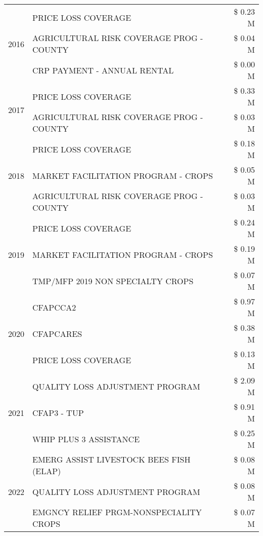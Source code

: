 \begin{tabular}{llr}
\cline{1-3}
\multirow[t]{3}{*}{2016} & PRICE LOSS COVERAGE & \$ 0.23 M \\
 & AGRICULTURAL RISK COVERAGE PROG - COUNTY & \$ 0.04 M \\
 & CRP PAYMENT - ANNUAL RENTAL & \$ 0.00 M \\
\cline{1-3}
\multirow[t]{2}{*}{2017} & PRICE LOSS COVERAGE & \$ 0.33 M \\
 & AGRICULTURAL RISK COVERAGE PROG - COUNTY & \$ 0.03 M \\
\cline{1-3}
\multirow[t]{3}{*}{2018} & PRICE LOSS COVERAGE & \$ 0.18 M \\
 & MARKET FACILITATION PROGRAM - CROPS & \$ 0.05 M \\
 & AGRICULTURAL RISK COVERAGE PROG - COUNTY & \$ 0.03 M \\
\cline{1-3}
\multirow[t]{3}{*}{2019} & PRICE LOSS COVERAGE & \$ 0.24 M \\
 & MARKET FACILITATION PROGRAM - CROPS & \$ 0.19 M \\
 & TMP/MFP 2019 NON SPECIALTY CROPS & \$ 0.07 M \\
\cline{1-3}
\multirow[t]{3}{*}{2020} & CFAPCCA2 & \$ 0.97 M \\
 & CFAPCARES & \$ 0.38 M \\
 & PRICE LOSS COVERAGE & \$ 0.13 M \\
\cline{1-3}
\multirow[t]{3}{*}{2021} & QUALITY LOSS ADJUSTMENT PROGRAM & \$ 2.09 M \\
 & CFAP3 - TUP & \$ 0.91 M \\
 & WHIP PLUS 3 ASSISTANCE & \$ 0.25 M \\
\cline{1-3}
\multirow[t]{3}{*}{2022} & EMERG ASSIST LIVESTOCK BEES FISH (ELAP) & \$ 0.08 M \\
 & QUALITY LOSS ADJUSTMENT PROGRAM & \$ 0.08 M \\
 & EMGNCY RELIEF PRGM-NONSPECIALITY CROPS & \$ 0.07 M \\
\cline{1-3}
\bottomrule
\end{tabular}
